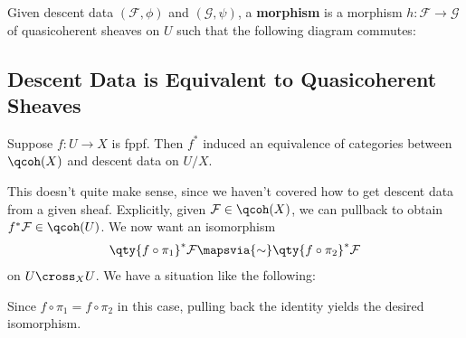 \begin{definition}

Given descent data \((\mathcal{F}, \phi)\) and \((\mathcal{G}, \psi)\),
a \textbf{morphism} is a morphism \(h: \mathcal{F} \to \mathcal{G}\) of
quasicoherent sheaves on \(U\) such that the following diagram commutes:

\begin{center}
\end{center}

\end{definition}

\hypertarget{descent-data-is-equivalent-to-quasicoherent-sheaves}{%
\subsection{Descent Data is Equivalent to Quasicoherent
Sheaves}\label{descent-data-is-equivalent-to-quasicoherent-sheaves}}

\begin{theorem}

Suppose \(f: U\to X\) is fppf. Then \(f^*\) induced an equivalence of
categories between \(\qcoh(X)\) and descent data on \(U/X\).

\end{theorem}

\begin{remark}

This doesn't quite make sense, since we haven't covered how to get
descent data from a given sheaf. Explicitly, given
\(\mathcal{F}\in \qcoh(X)\), we can pullback to obtain
\(f^* \mathcal{F}\in \qcoh(U)\). We now want an isomorphism
\begin{align*}  
\qty{f\circ \pi_1}^* \mathcal{F} \mapsvia{\sim} \qty{f\circ \pi_2}^* \mathcal{F}
\end{align*} on \(U\cross_X U\). We have a situation like the following:

\begin{center}
\end{center}

Since \(f\circ \pi_1 = f\circ \pi_2\) in this case, pulling back the
identity yields the desired isomorphism.

\end{remark}

